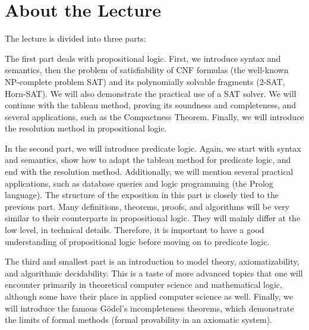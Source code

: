 \section{About the Lecture}

The lecture is divided into three parts:

The first part deals with propositional logic. First, we introduce syntax and semantics, then the problem of satisfiability of CNF formulas (the well-known NP-complete problem SAT) and its polynomially solvable fragments (2-SAT, Horn-SAT). We will also demonstrate the practical use of a SAT solver. We will continue with the tableau method, proving its soundness and completeness, and several applications, such as the Compactness Theorem. Finally, we will introduce the resolution method in propositional logic.

In the second part, we will introduce predicate logic. Again, we start with syntax and semantics, show how to adapt the tableau method for predicate logic, and end with the resolution method. Additionally, we will mention several practical applications, such as database queries and logic programming (the Prolog language). The structure of the exposition in this part is closely tied to the previous part. Many definitions, theorems, proofs, and algorithms will be very similar to their counterparts in propositional logic. They will mainly differ at the low level, in technical details. Therefore, it is important to have a good understanding of propositional logic before moving on to predicate logic.

The third and smallest part is an introduction to model theory, axiomatizability, and algorithmic decidability. This is a taste of more advanced topics that one  will encounter primarily in theoretical computer science and mathematical logic, although some have their place in applied computer science as well. Finally, we will introduce the famous Gödel's incompleteness theorems, which demonstrate the limits of formal methods (formal provability in an axiomatic system).




